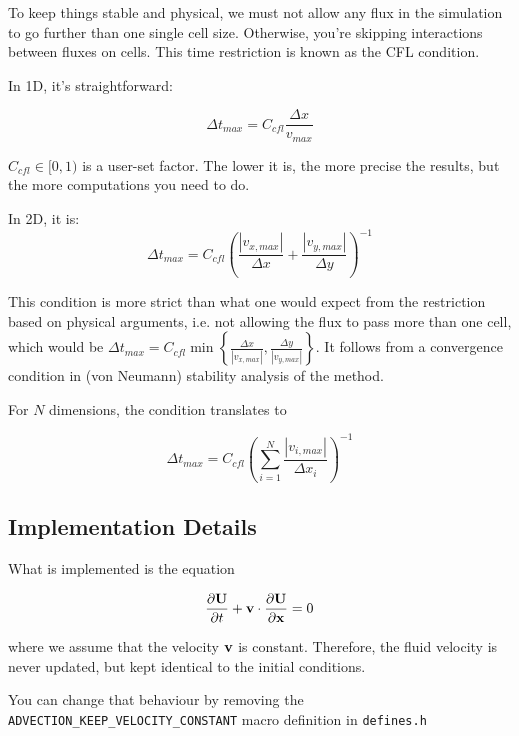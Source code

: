 To keep things stable and physical, we must not allow any flux in the simulation to go further than one single cell size.
Otherwise, you're skipping interactions between fluxes on cells.
This time restriction is known as the CFL condition.

In 1D, it's straightforward:

\begin{equation}
	\Delta t_{max} = C_{cfl} \frac{\Delta x}{v_{max}} \label{eq:CFL1D}
\end{equation}

$C_{cfl} \in [0, 1) $ is a user-set factor.
The lower it is, the more precise the results, but the more computations you need to do.

In 2D, it is:
\begin{equation}
	\Delta t_{max} = C_{cfl} \left( \frac{|v_{x,max}|}{\Delta x} +  \frac{|v_{y,max}|}{\Delta y} \right)^{-1} \label{eq:CFL2D}
\end{equation}

This condition is more strict than what one would expect from the restriction based on physical arguments, i.e. not allowing the flux to pass more than one cell, which would be $\Delta t_{max} = C_{cfl} \min \left\{ \frac{\Delta x}{|v_{x,max}|} ,  \frac{\Delta y}{|v_{y,max}|} \right\} $.
It follows from a convergence condition in (von Neumann) stability analysis of the method.

For $N$ dimensions, the condition translates to

\begin{equation}
	\Delta t_{max} = C_{cfl} \left( \sum_{i=1}^{N} \frac{|v_{i,max}|}{\Delta x_i} \right)^{-1}  \label{eq:CFLND}
\end{equation}








\subsection{Implementation Details}


What is implemented is the equation

\begin{equation}
    \frac{\partial \mathbf{U}}{\partial t} + \mathbf{v} \cdot \frac{\partial \mathbf{U}}{\partial \mathbf{x}} = 0
\end{equation}


where we assume that the velocity $\mathbf{v}$ is constant. 
Therefore, the fluid velocity is never updated, but kept identical to the initial conditions.

You can change that behaviour by removing the \verb|ADVECTION_KEEP_VELOCITY_CONSTANT| macro definition in \verb|defines.h|

